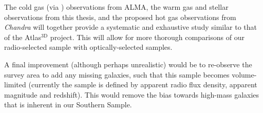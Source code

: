 	The cold gas (via ) observations from ALMA, the warm gas and stellar observations from this thesis, and the proposed hot gas observations from \textit{Chandra} will together provide a systematic and exhaustive study similar to that of the Atlas$^\text{3D}$ project. This will allow for more thorough comparisons of our radio-selected sample with optically-selected samples.

	A final improvement (although perhaps unrealistic) would be to re-observe the survey area to add any missing galaxies, such that this sample becomes volume-limited (currently the sample is defined by apparent radio flux density, apparent magnitude and redshift). This would remove the bias towards high-mass galaxies that is inherent in our Southern Sample.

